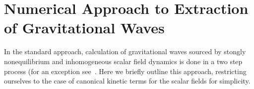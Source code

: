 \documentclass{revtex4}
\begin{document}

\section{Numerical Approach to Extraction of Gravitational Waves}
In the standard approach, calculation of gravitational waves sourced by stongly nonequilibrium and inhomogeneous scalar field dynamics is done in a two step process (for an exception see~\cite{Huang:HLattice,Bastero-Gil}.
Here we briefly outline this approach, restricting ourselves to the case of canonical kinetic terms for the scalar fields for simplicity.
\end{document}
